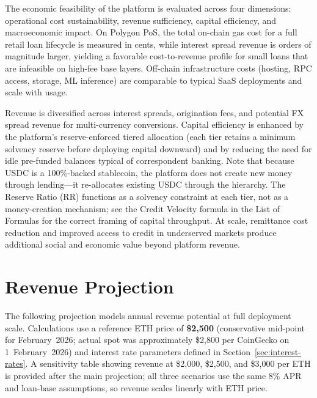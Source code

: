 \documentclass[12pt,a4paper]{report}
\begin{document}
The economic feasibility of the platform is evaluated across four dimensions: operational cost sustainability, revenue sufficiency, capital efficiency, and macroeconomic impact. On Polygon PoS, the total on-chain gas cost for a full retail loan lifecycle is measured in cents, while interest spread revenue is orders of magnitude larger, yielding a favorable cost-to-revenue profile for small loans that are infeasible on high-fee base layers. Off-chain infrastructure costs (hosting, RPC access, storage, ML inference) are comparable to typical SaaS deployments and scale with usage.

Revenue is diversified across interest spreads, origination fees, and potential FX spread revenue for multi-currency conversions. Capital efficiency is enhanced by the platform's reserve-enforced tiered allocation (each tier retains a minimum solvency reserve before deploying capital downward) and by reducing the need for idle pre-funded balances typical of correspondent banking. Note that because USDC is a 100\%-backed stablecoin, the platform does not create new money through lending---it re-allocates existing USDC through the hierarchy. The Reserve Ratio (RR) functions as a solvency constraint at each tier, not as a money-creation mechanism; see the Credit Velocity formula in the List of Formulas for the correct framing of capital throughput. At scale, remittance cost reduction and improved access to credit in underserved markets produce additional social and economic value beyond platform revenue.

\section{Revenue Projection}

The following projection models annual revenue potential at full deployment scale. Calculations use a reference ETH price of \textbf{\$2,500} (conservative mid-point for February~2026; actual spot was approximately \$2,800 per CoinGecko on 1~February~2026) and interest rate parameters defined in Section~\ref{sec:interest-rates}. A sensitivity table showing revenue at \$2,000, \$2,500, and \$3,000 per ETH is provided after the main projection; all three scenarios use the same 8\% APR and loan-base assumptions, so revenue scales linearly with ETH price.
\end{document}
